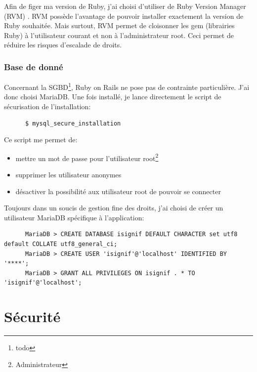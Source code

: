\documentclass[]{report}
\begin{document}
      Afin de figer ma version de Ruby, j’ai choisi d’utiliser de Ruby Version Manager (RVM) . RVM possède l’avantage de pouvoir installer exactement la version de Ruby souhaitée. Mais surtout, RVM permet de cloisonner les gem (librairies Ruby) à l’utilisateur courant et non à l’administrateur root. Ceci permet de réduire les risques d’escalade de droits.

    \subsection{Base de donné}

      Concernant la SGBD\footnote{todo}, Ruby on Rails ne pose pas de contrainte particulière. J’ai donc choisi MariaDB. Une fois installé, je lance directement le script de sécurisation de l’installation:

      \begin{scriptsize}
      \begin{verbatim}
      $ mysql_secure_installation
      \end{verbatim}
      \end{scriptsize}

      Ce script me permet de:

      \begin{itemize}
      \item mettre un mot de passe pour l’utilisateur root\footnote{Administrateur}
      \item supprimer les utilisateur anonymes
      \item désactiver la possibilité aux utilisateur root de pouvoir se connecter
      \end{itemize}

      Toujours dans un soucis de gestion fine des droits, j’ai choisi de créer un utilisateur MariaDB spécifique à l’application:

      \begin{scriptsize}
      \begin{verbatim}
      MariaDB > CREATE DATABASE isignif DEFAULT CHARACTER set utf8   default COLLATE utf8_general_ci;
      MariaDB > CREATE USER 'isignif'@'localhost' IDENTIFIED BY '****';
      MariaDB > GRANT ALL PRIVILEGES ON isignif . * TO 'isignif'@'localhost';
      \end{verbatim}
      \end{scriptsize}

\chapter{Sécurité}
\end{document}

